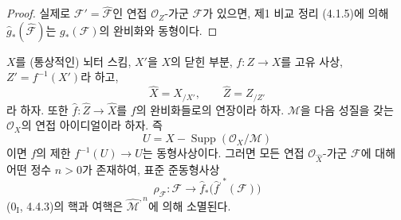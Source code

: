 \begin{proof}
실제로 $\mathcal F'=\widehat{\mathcal F}$인 연접
$\mathcal O_Z$-가군 $\mathcal F$가 있으면, 제1 비교 정리
(4.1.5)에 의해 $\widehat g_*(\widehat{\mathcal F})$는
$g_*(\mathcal F)$의 완비화와 동형이다.
\end{proof}

\begin{lemma}[5.3.4]
\label{III.5.3.4-fr}
$X$를 (통상적인) 뇌터 스킴, $X'$을 $X$의 닫힌 부분,
$f:Z\to X$를 고유 사상, $Z'=f^{-1}(X')$라 하고,
\[
\widehat X=X_{/X'},\qquad \widehat Z=Z_{/Z'}
\]
라 하자. 또한 $\widehat f:\widehat Z\to\widehat X$를 $f$의
완비화들로의 연장이라 하자. $\mathcal M$을 다음 성질을 갖는
$\mathcal O_X$의 연접 아이디얼이라 하자. 즉
\[
U=X-\operatorname{Supp}(\mathcal O_X/\mathcal M)
\]
이면 $f$의 제한 $f^{-1}(U)\to U$는 동형사상이다. 그러면 모든
연접 $\mathcal O_{\widehat X}$-가군 $\mathcal F$에 대해 어떤 정수
$n>0$가 존재하여, 표준 준동형사상
\[
\rho_{\mathcal F}:\mathcal F\longrightarrow
\widehat f_*\bigl(\widehat f^{,*}(\mathcal F)\bigr)
\]
($0_{\mathrm I}$, 4.4.3)의 핵과 여핵은
$\widehat{\mathcal M}^{,n}$에 의해 소멸된다.
\end{lemma}

